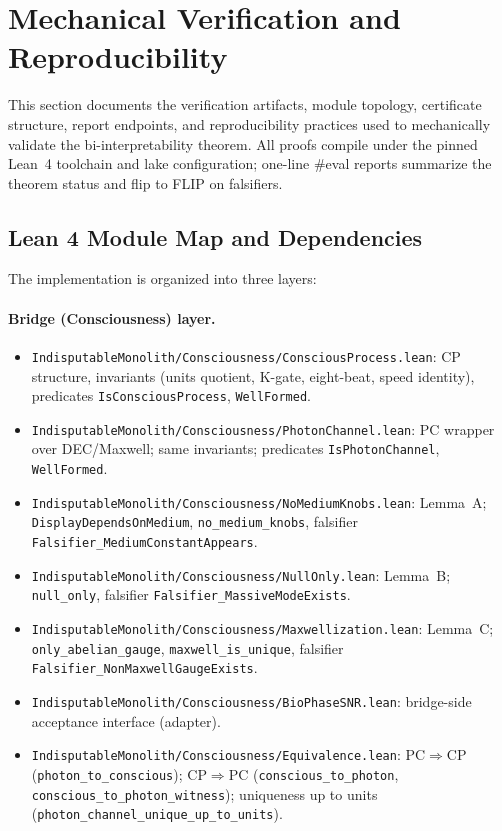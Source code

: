 \documentclass[12pt,a4paper]{article}
\begin{document}
\section{Mechanical Verification and Reproducibility}
\label{sec:mechanical-verification}

This section documents the verification artifacts, module topology, certificate structure, report endpoints, and reproducibility practices used to mechanically validate the bi-interpretability theorem. All proofs compile under the pinned Lean~4 toolchain and lake configuration; one-line \#eval reports summarize the theorem status and flip to FLIP on falsifiers.

\subsection{Lean 4 Module Map and Dependencies}
The implementation is organized into three layers:

\paragraph{Bridge (Consciousness) layer.}
\begin{itemize}
  \item \texttt{IndisputableMonolith/Consciousness/ConsciousProcess.lean}:
    CP structure, invariants (units quotient, K-gate, eight-beat, speed identity), predicates \texttt{IsConsciousProcess}, \texttt{WellFormed}.
  \item \texttt{IndisputableMonolith/Consciousness/PhotonChannel.lean}:
    PC wrapper over DEC/Maxwell; same invariants; predicates \texttt{IsPhotonChannel}, \texttt{WellFormed}.
  \item \texttt{IndisputableMonolith/Consciousness/NoMediumKnobs.lean}:
    Lemma~A; \texttt{DisplayDependsOnMedium}, \texttt{no\_medium\_knobs}, falsifier \texttt{Falsifier\_MediumConstantAppears}.
  \item \texttt{IndisputableMonolith/Consciousness/NullOnly.lean}:
    Lemma~B; \texttt{null\_only}, falsifier \texttt{Falsifier\_MassiveModeExists}.
  \item \texttt{IndisputableMonolith/Consciousness/Maxwellization.lean}:
    Lemma~C; \texttt{only\_abelian\_gauge}, \texttt{maxwell\_is\_unique}, falsifier \texttt{Falsifier\_NonMaxwellGaugeExists}.
  \item \texttt{IndisputableMonolith/Consciousness/BioPhaseSNR.lean}:
    bridge-side acceptance interface (adapter).
  \item \texttt{IndisputableMonolith/Consciousness/Equivalence.lean}:
    PC\(\Rightarrow\)CP (\texttt{photon\_to\_conscious}); CP\(\Rightarrow\)PC (\texttt{conscious\_to\_photon}, \texttt{conscious\_to\_photon\_witness}); uniqueness up to units (\texttt{photon\_channel\_unique\_up\_to\_units}).
\end{itemize}
\end{document}
